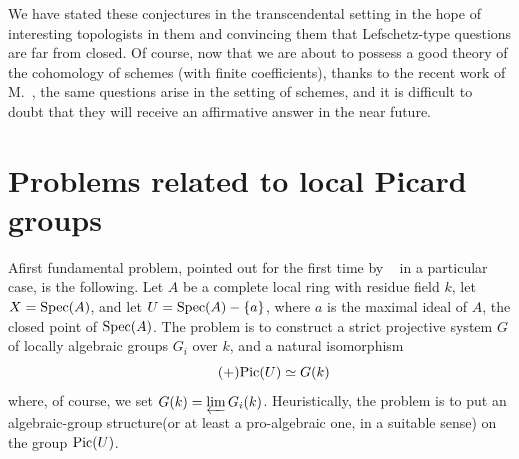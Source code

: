 We have stated these conjectures in the transcendental setting in the
hope of interesting topologists in them and convincing them that
\og Lefschetz\fg-type questions are far from closed. Of course, now that
we are about to possess a good theory of the cohomology of schemes (with
finite coefficients), thanks to the recent work of M.~,
the same questions arise in the setting of schemes, and it is difficult
to doubt that they will receive an affirmative answer in the near
future.

\section{Problems related to local Picard groups} \label{XIII.5}

A\pageoriginale first fundamental problem, pointed out for the first time by ~\cite{XIII.5} in a particular case, is the following. Let $A$ be a complete local ring with residue field $k$, let $X=\Spec(A)$, and let $U=\Spec(A)-\{a\}$, where $a$ is the maximal ideal of $A$, \ie the closed point of $\Spec(A)$. The problem is to construct a strict projective system $G$ of locally algebraic groups $G_i$ over $k$, and a natural isomorphism
\begin{equation*} \label{eq:XIII.5.+} \tag{$+$} {\Pic(U)\simeq G(k)} \end{equation*}
where, of course, we set $G(k)=\varprojlim G_i(k)$. Heuristically, the problem is to \og put an algebraic-group structure\fg (or at least a pro-algebraic one, in a suitable sense) on the group $\Pic(\sisi{X'}{U})$.

